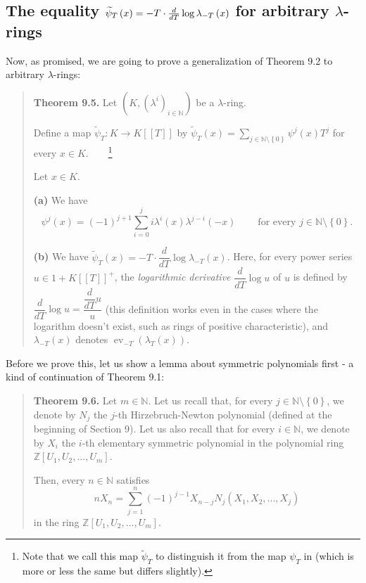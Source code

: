 \documentclass[numbers=enddot,12pt,final,onecolumn,notitlepage]{scrartcl}%
\begin{document}
\subsection{The equality $\protect\widetilde{\psi}_{T}\left(  x\right)
=-T\cdot\frac{d}{dT}\log\lambda_{-T}\left(  x\right)  $ for arbitrary
$\lambda$-rings}

Now, as promised, we are going to prove a generalization of Theorem 9.2 to
arbitrary $\lambda$-rings:

\begin{quote}
\textbf{Theorem 9.5.} Let $\left(  K,\left(  \lambda^{i}\right)
_{i\in\mathbb{N}}\right)  $ be a $\lambda$-ring.

Define a map $\widetilde{\psi}_{T}:K\rightarrow K\left[  \left[  T\right]
\right]  $ by $\widetilde{\psi}_{T}\left(  x\right)  =\sum\limits_{j\in
\mathbb{N}\setminus\left\{  0\right\}  }\psi^{j}\left(  x\right)  T^{j}$ for
every $x\in K$.\ \ \ \ \footnote{Note that we call this map $\widetilde{\psi
}_{T}$ to distinguish it from the map $\psi_{T}$ in \cite{FulLan85} (which is
more or less the same but differs slightly).}

Let $x\in K$.

\textbf{(a)} We have%
\[
\psi^{j}\left(  x\right)  =\left(  -1\right)  ^{j+1}\sum_{i=0}^{j}i\lambda
^{i}\left(  x\right)  \lambda^{j-i}\left(  -x\right)
\ \ \ \ \ \ \ \ \ \ \text{for every }j\in\mathbb{N}\setminus\left\{
0\right\}  \text{.}%
\]


\textbf{(b)} We have $\widetilde{\psi}_{T}\left(  x\right)  =-T\cdot\dfrac
{d}{dT}\log\lambda_{-T}\left(  x\right)  $. Here, for every power series
$u\in1+K\left[  \left[  T\right]  \right]  ^{+}$, the \textit{logarithmic
derivative} $\dfrac{d}{dT}\log u$ of $u$ is defined by $\dfrac{d}{dT}\log
u=\dfrac{\dfrac{d}{dT}u}{u}$ (this definition works even in the cases where
the logarithm doesn't exist, such as rings of positive characteristic), and
$\lambda_{-T}\left(  x\right)  $ denotes $\operatorname*{ev}_{-T}\left(
\lambda_{T}\left(  x\right)  \right)  $.
\end{quote}

Before we prove this, let us show a lemma about symmetric polynomials first -
a kind of continuation of Theorem 9.1:

\begin{quote}
\textbf{Theorem 9.6.} Let $m\in\mathbb{N}$. Let us recall that, for every
$j\in\mathbb{N}\setminus\left\{  0\right\}  $, we denote by $N_{j}$ the $j$-th
Hirzebruch-Newton polynomial (defined at the beginning of Section 9). Let us
also recall that for every $i\in\mathbb{N}$, we denote by $X_{i}$ the $i$-th
elementary symmetric polynomial in the polynomial ring $\mathbb{Z}\left[
U_{1},U_{2},...,U_{m}\right]  $.

Then, every $n\in\mathbb{N}$ satisfies%
\[
nX_{n}=\sum_{j=1}^{n}\left(  -1\right)  ^{j-1}X_{n-j}N_{j}\left(  X_{1}%
,X_{2},...,X_{j}\right)
\]
in the ring $\mathbb{Z}\left[  U_{1},U_{2},...,U_{m}\right]  $.
\end{quote}
\end{document}
